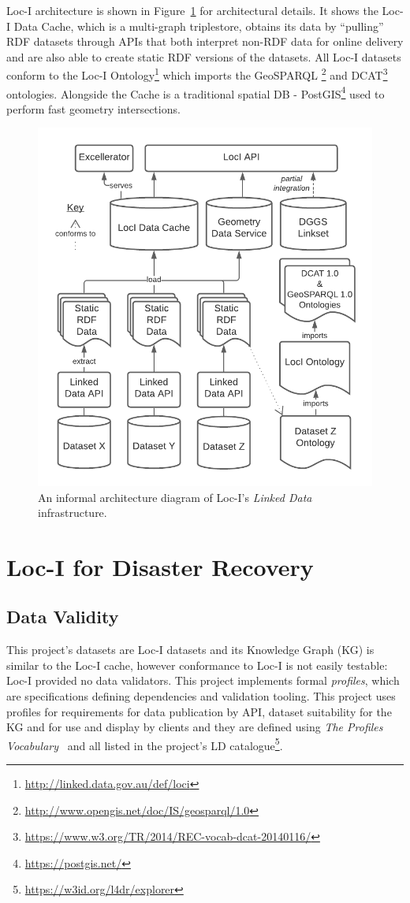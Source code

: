 \documentclass[runningheads]{llncs}
\begin{document}
Loc-I architecture is shown in Figure~\ref{fig:loci-arch} for architectural details. It shows the Loc-I Data Cache, which is a multi-graph triplestore, 
obtains its data by ``pulling'' RDF datasets through APIs that both interpret non-RDF data for online delivery and are also able to create static RDF 
versions of the datasets. All Loc-I datasets conform to the Loc-I Ontology\footnote{\url{http://linked.data.gov.au/def/loci}} which imports the GeoSPARQL
\footnote{\url{http://www.opengis.net/doc/IS/geosparql/1.0}} and DCAT\footnote{\url{https://www.w3.org/TR/2014/REC-vocab-dcat-20140116/}} ontologies. 
Alongside the Cache is a traditional spatial DB - PostGIS\footnote{\url{https://postgis.net/}} used to perform fast geometry intersections.

\begin{figure}[htb]
    \centering
    \includegraphics[width=0.8\linewidth]{images/loci-arch.png}
    \caption{An informal architecture diagram of Loc-I's \textit{Linked Data} infrastructure.}
    \label{fig:loci-arch}
\end{figure}

\section{Loc-I for Disaster Recovery}\label{sec:changes}
\subsection{Data Validity}
This project's datasets are Loc-I datasets and its Knowledge Graph (KG) is similar to the Loc-I cache, however conformance to Loc-I is not easily
testable: Loc-I provided no data validators. This project implements formal \textit{profiles}, which 
are specifications defining dependencies and validation tooling. This project uses profiles for requirements for data 
publication by API, dataset suitability for the KG and for use and display by clients and they are defined using 
\textit{The Profiles Vocabulary}~\cite{atkinson_profiles_2020} and all listed in the project's LD catalogue\footnote{\label{catalogue} \url{https://w3id.org/l4dr/explorer}}.
\end{document}
